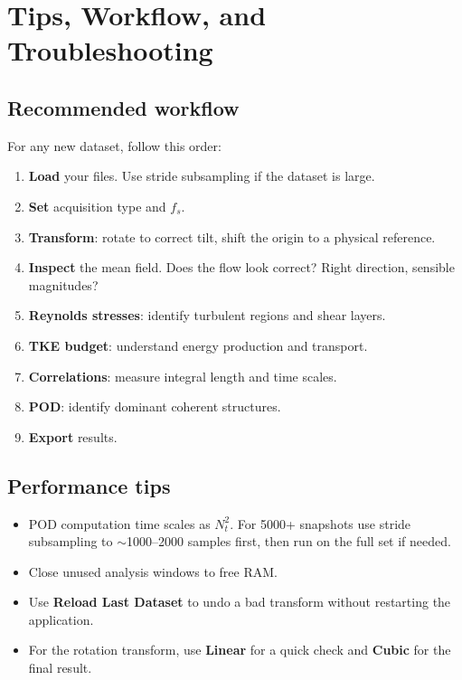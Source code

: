\documentclass[11pt, a4paper]{report}
\newcommand{\uipth}[1]{\textbf{\textcolor{upblue}{#1}}}
\begin{document}
\chapter{Tips, Workflow, and Troubleshooting}

\section{Recommended workflow}

For any new dataset, follow this order:

\begin{enumerate}[leftmargin=1.5em]
  \item \textbf{Load} your files. Use stride subsampling if the dataset is large.
  \item \textbf{Set} acquisition type and $f_s$.
  \item \textbf{Transform}: rotate to correct tilt, shift the origin to a physical reference.
  \item \textbf{Inspect} the mean field. Does the flow look correct? Right direction, sensible magnitudes?
  \item \textbf{Reynolds stresses}: identify turbulent regions and shear layers.
  \item \textbf{TKE budget}: understand energy production and transport.
  \item \textbf{Correlations}: measure integral length and time scales.
  \item \textbf{POD}: identify dominant coherent structures.
  \item \textbf{Export} results.
\end{enumerate}

\section{Performance tips}

\begin{itemize}[leftmargin=1.5em]
  \item POD computation time scales as $N_t^2$. For 5000+ snapshots use stride subsampling to $\sim$1000--2000 samples first, then run on the full set if needed.
  \item Close unused analysis windows to free RAM.
  \item Use \uipth{Reload Last Dataset} to undo a bad transform without restarting the application.
  \item For the rotation transform, use \uipth{Linear} for a quick check and \uipth{Cubic} for the final result.
\end{itemize}
\end{document}
